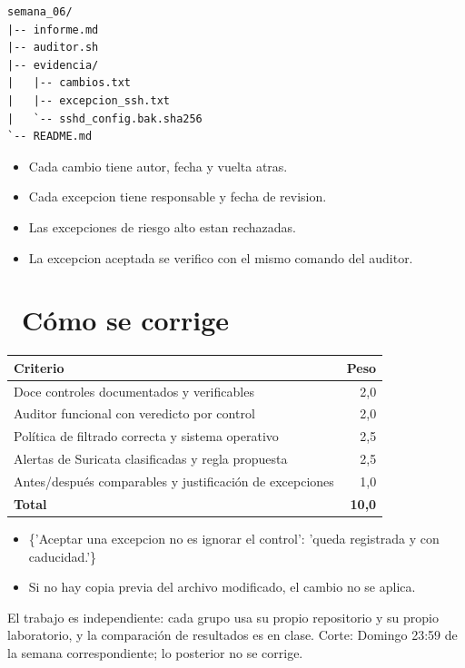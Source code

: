 \documentclass[11pt,a4paper]{article}
\newcommand{\iconotexto}[2]{\textcolor{cyanNeon}{\faIcon{#1}}~#2}
\begin{document}
\begin{lstlisting}[style=estiloCodigo]
semana_06/
|-- informe.md
|-- auditor.sh
|-- evidencia/
|   |-- cambios.txt
|   |-- excepcion_ssh.txt
|   `-- sshd_config.bak.sha256
`-- README.md
\end{lstlisting}

\begin{itemize}[leftmargin=1.4em,itemsep=2pt,topsep=3pt]
  \item Cada cambio tiene autor, fecha y vuelta atras.
  \item Cada excepcion tiene responsable y fecha de revision.
  \item Las excepciones de riesgo alto estan rechazadas.
  \item La excepcion aceptada se verifico con el mismo comando del auditor.
\end{itemize}

\section{\iconotexto{ruler-combined}{Cómo se corrige}}

\begin{tabularx}{\linewidth}{@{}X r@{}}
\toprule
Criterio & Peso\\
\midrule
Doce controles documentados y verificables & 2,0 \\
Auditor funcional con veredicto por control & 2,0 \\
Política de filtrado correcta y sistema operativo & 2,5 \\
Alertas de Suricata clasificadas y regla propuesta & 2,5 \\
Antes/después comparables y justificación de excepciones & 1,0 \\
\midrule
\textbf{Total} & \textbf{10,0}\\
\bottomrule
\end{tabularx}

\begin{itemize}[leftmargin=1.4em,itemsep=2pt,topsep=3pt]
  \item \{'Aceptar una excepcion no es ignorar el control': 'queda registrada y con caducidad.'\}
  \item Si no hay copia previa del archivo modificado, el cambio no se aplica.
\end{itemize}

\begin{cajaRecuerda}El trabajo es independiente: cada grupo usa su propio repositorio y su propio laboratorio, y la comparación de resultados es en clase. Corte: Domingo 23:59 de la semana correspondiente; lo posterior no se corrige.
\end{cajaRecuerda}
\end{document}
